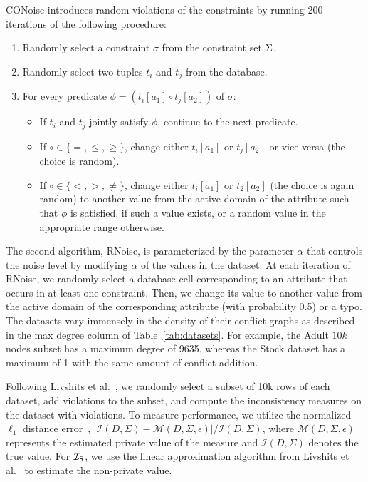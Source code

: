 \else
CONoise introduces random violations of the constraints by running 200 iterations of the following procedure:
\begin{enumerate}
    \item Randomly select a constraint $\sigma$ from the constraint set ${\Sigma}$.
    \item Randomly select two tuples $t_i$ and $t_j$ from the database.
    \item For every predicate $\phi = (t_i[a_1] \circ t_j[a_2])$ of $\sigma$:
    \begin{itemize}
        \item If $t_i$ and $t_j$ jointly satisfy $\phi$, continue to the next predicate.
        \item If $\circ \in \{=, \leq, \geq\}$, change either $t_i[a_1]$ or $t_j[a_2]$ or vice versa (the choice is random).
        \item If $\circ \in \{<, >, \neq\}$, change either $t_i[a_1]$ or $t_2[a_2]$ (the choice is again random) to another value from the active domain of the attribute such that $\phi$ is satisfied, if such a value exists, or a random value in the appropriate range otherwise.
    \end{itemize}
\end{enumerate}
The second algorithm, RNoise, is parameterized by the parameter $\alpha$ that controls the noise level by modifying $\alpha$ of the values in the dataset. At each iteration of RNoise, we randomly select a database cell corresponding to an attribute that occurs in at least one constraint. Then, we change its value to another value from the active domain of the corresponding attribute (with probability 0.5) or a typo. 
\fi
The datasets vary immensely in the density of their conflict graphs as described in the max degree column of Table~\ref{tab:datasets}. For example, the Adult $10k$ nodes subset has a maximum degree of 9635, whereas the Stock dataset has a maximum of 1 with the same amount of conflict addition. 

 Following Livshits et al.~\cite{LivshitsBKS20}, we randomly select a subset of 10k rows of each dataset, add violations to the subset, and compute the inconsistency measures on the dataset with violations.   To measure performance, we utilize the normalized $\ell_1$ distance error~\cite{dwork2006calibrating}, $|\mathcal{I}(D,\Sigma)-\mathcal{M}(D,\Sigma,\epsilon)| /\mathcal{I}(D,\Sigma)$, where $\mathcal{M}(D,\Sigma,\epsilon)$ represents the estimated private value of the measure and $\mathcal{I}(D,\Sigma)$ denotes the true value. For $\mathcal{I_\mathsf{R}}$, we use the linear approximation algorithm from Livshits et al.~\cite{LivshitsBKS20} to estimate the non-private value.  


